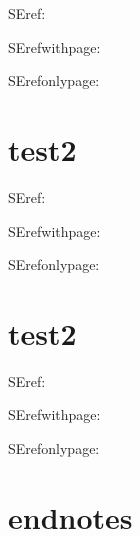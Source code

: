 \documentclass{article}
\begin{document}
SEref:  

SErefwithpage:  

SErefonlypage:  

\section{test2}

SEref:  

SErefwithpage:  

SErefonlypage:  

\section{test2}

SEref:  

SErefwithpage:  

SErefonlypage:  

\section{endnotes}

\end{document}
